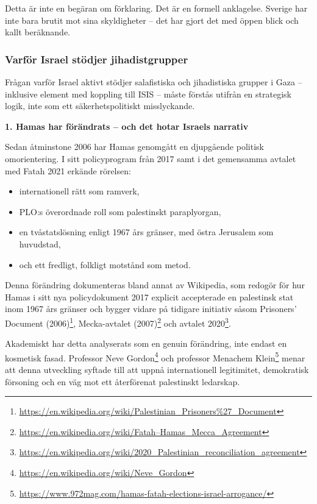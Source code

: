 \documentclass[12pt]{article}
\begin{document}
Detta är inte en begäran om förklaring. Det är en formell anklagelse. Sverige har inte bara brutit mot sina skyldigheter – det har gjort det med öppen blick och kallt beräknande.

\subsubsection*{Varför Israel stödjer jihadistgrupper}

Frågan varför Israel aktivt stödjer salafistiska och jihadistiska grupper i Gaza – inklusive element med koppling till ISIS – måste förstås utifrån en strategisk logik, inte som ett säkerhetspolitiskt misslyckande.

\textbf{1. Hamas har förändrats – och det hotar Israels narrativ}

Sedan åtminstone 2006 har Hamas genomgått en djupgående politisk omorientering. I sitt policyprogram från 2017 samt i det gemensamma avtalet med Fatah 2021 erkände rörelsen:

\begin{itemize}
  \item internationell rätt som ramverk,
  \item PLO:s överordnade roll som palestinskt paraplyorgan,
  \item en tvåstatslösning enligt 1967 års gränser, med östra Jerusalem som huvudstad,
  \item och ett fredligt, folkligt motstånd som metod.
\end{itemize}

Denna förändring dokumenteras bland annat av Wikipedia, som redogör för hur Hamas i sitt nya policydokument 2017 explicit accepterade en palestinsk stat inom 1967 års gränser och bygger vidare på tidigare initiativ såsom Prisoners’ Document (2006)\footnote{\url{https://en.wikipedia.org/wiki/Palestinian_Prisoners\%27_Document}}, Mecka-avtalet (2007)\footnote{\url{https://en.wikipedia.org/wiki/Fatah–Hamas_Mecca_Agreement}} och avtalet 2020\footnote{\url{https://en.wikipedia.org/wiki/2020_Palestinian_reconciliation_agreement}}.

Akademiskt har detta analyserats som en genuin förändring, inte endast en kosmetisk fasad. Professor Neve Gordon\footnote{\url{https://en.wikipedia.org/wiki/Neve_Gordon}} och professor Menachem Klein\footnote{\url{https://www.972mag.com/hamas-fatah-elections-israel-arrogance/}} menar att denna utveckling syftade till att uppnå internationell legitimitet, demokratisk försoning och en väg mot ett återförenat palestinskt ledarskap.
\end{document}
